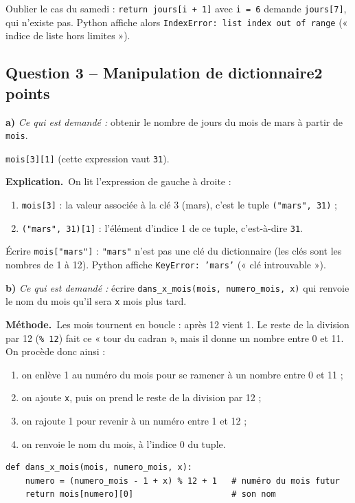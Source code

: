 \documentclass[11pt, a4paper]{exam}
\newcommand{\code}[1]{\texttt{#1}}
\newcommand{\Qt}[2]{\subsection*{#1\hfill{\normalfont\small #2}}}
\newcommand{\rappel}[1]{\noindent\textit{Ce qui est demandé :} #1\par\smallskip}
\newcommand{\methode}{\noindent\textbf{Méthode.}\ }
\newcommand{\explication}{\noindent\textbf{Explication.}\ }
\begin{document}
\begin{erreur}
Oublier le cas du samedi : \code{return jours[i + 1]} avec \code{i = 6} demande \code{jours[7]}, qui n'existe pas. Python affiche alors \code{IndexError: list index out of range} (« indice de liste hors limites »).
\end{erreur}

\Qt{Question 3 -- Manipulation de dictionnaire}{2 points}

\textbf{a)} \rappel{obtenir le nombre de jours du mois de mars à partir de \code{mois}.}
\begin{reponse}
\code{mois[3][1]} (cette expression vaut \code{31}).
\end{reponse}
\explication On lit l'expression de gauche à droite :
\begin{enumerate}
\item \code{mois[3]} : la valeur associée à la clé 3 (mars), c'est le tuple \code{("mars", 31)} ;
\item \code{("mars", 31)[1]} : l'élément d'indice 1 de ce tuple, c'est-à-dire \code{31}.
\end{enumerate}

\begin{erreur}
Écrire \code{mois["mars"]} : \code{"mars"} n'est pas une clé du dictionnaire (les clés sont les nombres de 1 à 12). Python affiche \code{KeyError: 'mars'} (« clé introuvable »).
\end{erreur}

\textbf{b)} \rappel{écrire \code{dans\_x\_mois(mois, numero\_mois, x)} qui renvoie le nom du mois qu'il sera \code{x} mois plus tard.}

\methode Les mois tournent en boucle : après 12 vient 1. Le reste de la division par 12 (\code{\% 12}) fait ce « tour du cadran », mais il donne un nombre entre 0 et 11. On procède donc ainsi :
\begin{enumerate}
\item on enlève 1 au numéro du mois pour se ramener à un nombre entre 0 et 11 ;
\item on ajoute \code{x}, puis on prend le reste de la division par 12 ;
\item on rajoute 1 pour revenir à un numéro entre 1 et 12 ;
\item on renvoie le nom du mois, à l'indice 0 du tuple.
\end{enumerate}

\begin{reponse}
\begin{lstlisting}
def dans_x_mois(mois, numero_mois, x):
    numero = (numero_mois - 1 + x) % 12 + 1   # numéro du mois futur
    return mois[numero][0]                    # son nom
\end{lstlisting}
\end{reponse}
\end{document}

